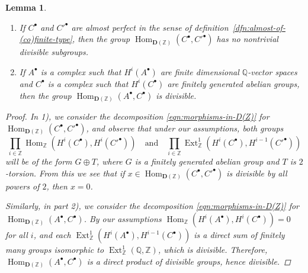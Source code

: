 \documentclass[leqno,12pt]{article}
\theoremstyle{plain}
\newtheorem{lemma}[theorem]{\indent\sc Lemma}
\theoremstyle{definition}
\DeclareMathOperator{\Hom}{Hom}
\DeclareMathOperator{\Ext}{Ext}
\newcommand{\QQ}{\mathbb{Q}}
\newcommand{\ZZ}{\mathbb{Z}}
\begin{document}
\begin{lemma}
  \label{lemma:morphisms-inDAb-not-divisible}
  ~

  \begin{enumerate}
  \item[$1)$] If $C^\bullet$ and $C'^\bullet$ are almost perfect in the sense of
    definition~{\rm\ref{dfn:almost-of-(co)finite-type}}, then the group
    $\Hom_{\mathbf{D} (\ZZ)} (C^\bullet, C'^\bullet)$ has no nontrivial
    divisible subgroups.

  \item[$2)$] If $A^\bullet$ is a complex such that $H^i (A^\bullet)$ are finite
    dimensional $\QQ$-vector spaces and $C^\bullet$ is a complex such that
    $H^i (C^\bullet)$ are finitely generated abelian groups, then the group
    $\Hom_{\mathbf{D} (\ZZ)} (A^\bullet, C^\bullet)$ is divisible.
  \end{enumerate}

  \begin{proof}
    In 1), we consider the decomposition \eqref{eqn:morphisms-in-D(Z)} for
    $\Hom_{\mathbf{D} (\ZZ)} (C^\bullet, C'^\bullet)$, and observe that under
    our assumptions, both groups
    \[ \prod_{i\in\ZZ} \Hom_\ZZ (H^i (C^\bullet), H^i (C'^\bullet))
      \quad\text{and}\quad
      \prod_{i\in\ZZ} \Ext_\ZZ^1 (H^i (C^\bullet), H^{i-1} (C'^\bullet))\]
    will be of the form $G \oplus T$, where $G$ is a finitely generated abelian
    group and $T$ is $2$-torsion. From this we see that if
    $x \in \Hom_{\mathbf{D} (\ZZ)} (C^\bullet, C'^\bullet)$ is divisible by all
    powers of $2$, then $x = 0$.

    Similarly, in part 2), we consider the decomposition
    \eqref{eqn:morphisms-in-D(Z)} for
    $\Hom_{\mathbf{D} (\ZZ)} (A^\bullet, C^\bullet)$. By our assumptions
    $\Hom_\ZZ (H^i (A^\bullet), H^i (C^\bullet)) = 0$ for all $i$, and each
    $\Ext_\ZZ^1 (H^i (A^\bullet), H^{i-1} (C^\bullet))$ is a direct sum of
    finitely many groups isomorphic to $\Ext_\ZZ^1 (\QQ,\ZZ)$, which is
    divisible. Therefore, $\Hom_{\mathbf{D} (\ZZ)} (A^\bullet, C^\bullet)$ is
    a direct product of divisible groups, hence divisible.
  \end{proof}
\end{lemma}
\end{document}
